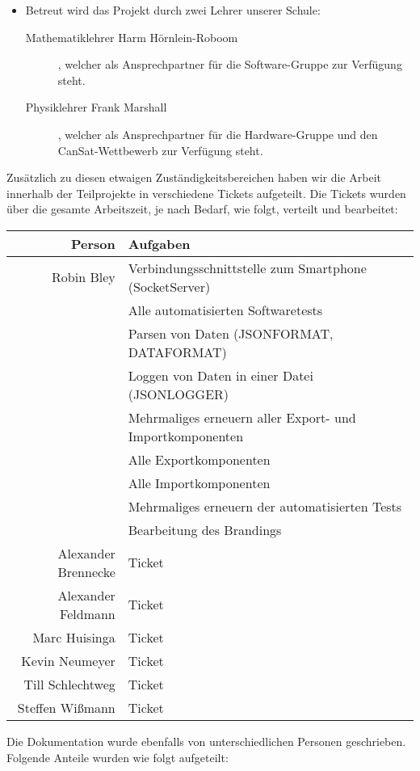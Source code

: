 \begin{itemize}
\item Betreut wird das Projekt durch zwei Lehrer unserer Schule:
\begin{description}
\item [Mathematiklehrer Harm Hörnlein-Roboom], welcher als Ansprechpartner für die Software-Gruppe zur Verfügung steht.
\item [Physiklehrer Frank Marshall], welcher als Ansprechpartner für die Hardware-Gruppe und den CanSat-Wettbewerb zur Verfügung steht.
\end{description}

\end{itemize}

Zusätzlich zu diesen etwaigen Zuständigkeitsbereichen haben wir die Arbeit innerhalb der Teilprojekte in verschiedene Tickets aufgeteilt. Die Tickets wurden über die gesamte Arbeitszeit, je nach Bedarf, wie folgt, verteilt und bearbeitet:

\begin{table}[H]
	\centering
	\begin{tabular}{rl}
		\toprule
		\textbf{Person} & \textbf{Aufgaben} \\
		\midrule
		Robin Bley & Verbindungsschnittstelle zum Smartphone (SocketServer) \\
		 & Alle automatisierten Softwaretests \\
		 & Parsen von Daten (JSONFORMAT, DATAFORMAT)\\
		 & Loggen von Daten in einer Datei (JSONLOGGER)\\
		 & Mehrmaliges erneuern aller Export- und Importkomponenten\\
		 & Alle Exportkomponenten\\
		 & Alle Importkomponenten\\
		 & Mehrmaliges erneuern der automatisierten Tests\\
		 & Bearbeitung des Brandings\\
		Alexander Brennecke & Ticket \\
		Alexander Feldmann & Ticket \\
		Marc Huisinga & Ticket \\
		Kevin Neumeyer & Ticket \\
		Till Schlechtweg & Ticket \\
		Steffen Wißmann & Ticket \\
		\bottomrule
	\end{tabular}
\end{table}

Die Dokumentation wurde ebenfalls von unterschiedlichen Personen geschrieben. Folgende Anteile wurden wie folgt aufgeteilt:

